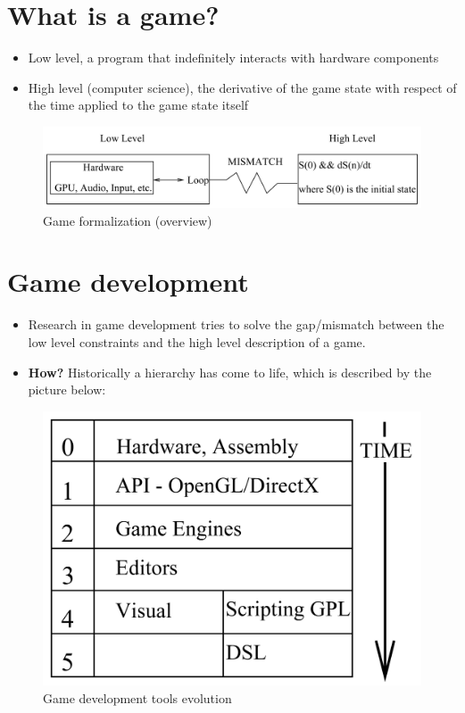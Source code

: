 \documentclass[10pt,a4paper]{book}
\begin{document}
\section{What is a game?}
\label{section_introduction}
\begin{itemize}
\item Low level, a program that indefinitely interacts with hardware components
\item High level (computer science), the derivative of the game state with respect of the time applied to the game state itself
\end{itemize}

\begin{figure}[h!]
\centering
\includegraphics[scale=0.5]{Figures/games_description.png}
\caption{Game formalization (overview)}\label{game_description}
\end{figure}

\section{Game development}
\begin{itemize}
\item Research in game development tries to solve the gap/mismatch between the low level constraints and the high level description of a game.
\item \textbf{How?} Historically a hierarchy has come to life, which is described by the picture below:
\end{itemize}

\begin{figure}[h!]
\centering
\includegraphics[scale=0.5]{Figures/game_development_evolution.png}
\caption{Game development tools evolution}\label{game_dvelopment}
\end{figure}
\end{document}
